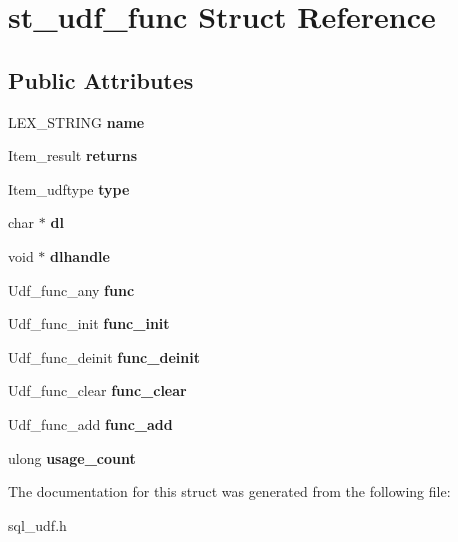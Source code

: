 \hypertarget{structst__udf__func}{}\section{st\+\_\+udf\+\_\+func Struct Reference}
\label{structst__udf__func}
\subsection*{Public Attributes}
\begin{DoxyCompactItemize}
\item 
\mbox{\label{structst__udf__func_ab5f411fefbd945459dc0eba471028f59}} 
L\+E\+X\+\_\+\+S\+T\+R\+I\+NG {\bfseries name}
\item 
\mbox{\label{structst__udf__func_affb90322c25aa7accf6206a2d9948152}} 
Item\+\_\+result {\bfseries returns}
\item 
\mbox{\label{structst__udf__func_a7dc533cb153f05c338d39fb0bbc01144}} 
Item\+\_\+udftype {\bfseries type}
\item 
\mbox{\label{structst__udf__func_ae8f1cf7b0ca29a0dd3888ab5036e3917}} 
char $\ast$ {\bfseries dl}
\item 
\mbox{\label{structst__udf__func_a4e41e147d9e69dc6ea6ffe575f0d2179}} 
void $\ast$ {\bfseries dlhandle}
\item 
\mbox{\label{structst__udf__func_adeafd9624ef7cb693ce18ff8c6f7eec0}} 
Udf\+\_\+func\+\_\+any {\bfseries func}
\item 
\mbox{\label{structst__udf__func_ad78eb7d948714c7173c7df6ac2a8b34e}} 
Udf\+\_\+func\+\_\+init {\bfseries func\+\_\+init}
\item 
\mbox{\label{structst__udf__func_a31fb1c71095471af17542ed641edcdda}} 
Udf\+\_\+func\+\_\+deinit {\bfseries func\+\_\+deinit}
\item 
\mbox{\label{structst__udf__func_a97231d099fcce2ab6f1364039b35231e}} 
Udf\+\_\+func\+\_\+clear {\bfseries func\+\_\+clear}
\item 
\mbox{\label{structst__udf__func_ac5508c64d78a1103ccf7ad613b806a2d}} 
Udf\+\_\+func\+\_\+add {\bfseries func\+\_\+add}
\item 
\mbox{\label{structst__udf__func_aacea2f2dbba8098661a2df0d9f839ee4}} 
ulong {\bfseries usage\+\_\+count}
\end{DoxyCompactItemize}


The documentation for this struct was generated from the following file\+:\begin{DoxyCompactItemize}
\item 
sql\+\_\+udf.\+h\end{DoxyCompactItemize}
